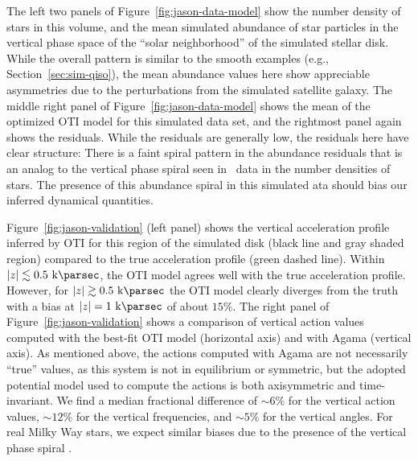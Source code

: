 The left two panels of Figure~\ref{fig:jason-data-model} show the number density of
stars in this volume, and the mean simulated  abundance of star particles
in the vertical phase space of the ``solar neighborhood'' of the simulated stellar disk.
While the overall pattern is similar to the smooth examples (e.g.,
Section~\ref{sec:sim-qiso}), the mean abundance values here show appreciable asymmetries
due to the perturbations from the simulated satellite galaxy.
The middle right panel of Figure~\ref{fig:jason-data-model} shows the mean 
of the optimized OTI model for this simulated data set, and the rightmost panel again
shows the residuals.
While the residuals are generally low, the residuals here have clear structure: There is
a faint spiral pattern in the abundance residuals that is an analog to the vertical
phase spiral seen in \gaia\ data in the number densities of stars.
The presence of this abundance spiral in this simulated ata should bias our inferred
dynamical quantities.

Figure~\ref{fig:jason-validation} (left panel) shows the vertical acceleration profile
inferred by OTI for this region of the simulated disk (black line and gray shaded
region) compared to the true acceleration profile (green dashed line).
Within $|z| \lesssim 0.5~\kpc$, the OTI model agrees well with the true acceleration
profile.
However, for $|z| \gtrsim 0.5~\kpc$ the OTI model clearly diverges from the truth with a
bias at $|z| = 1~\kpc$ of about $15\%$.
The right panel of Figure~\ref{fig:jason-validation} shows a comparison of vertical
action values computed with the best-fit OTI model (horizontal axis) and with Agama
(vertical axis).
As mentioned above, the actions computed with Agama are not necessarily ``true'' values,
as this system is not in equilibrium or symmetric, but the adopted potential model used
to compute the actions is both axisymmetric and time-invariant.
We find a median fractional difference of $\sim 6\%$ for the vertical action values,
$\sim 12\%$ for the vertical frequencies, and $\sim 5\%$ for the vertical angles.
For real Milky Way stars, we expect similar biases due to the presence of the vertical
phase spiral \citep{Antoja:2018}.


